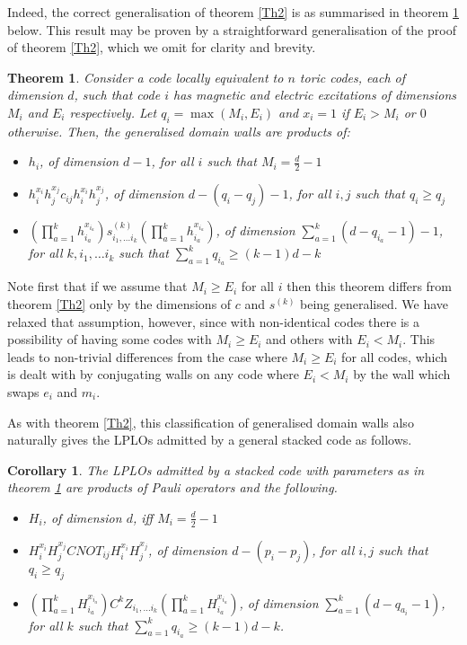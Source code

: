 \documentclass[pra,twocolumn,a4paper,nofootinbib]{revtex4-1}
\newtheorem{theorem}{Theorem}
\newtheorem{cor}{Corollary}
\begin{document}
Indeed, the correct generalisation of theorem \ref{Th2} is as summarised in theorem \ref{Th3} below. This result may be proven by a straightforward generalisation of the proof of theorem \ref{Th2}, which we omit for clarity and brevity.

\begin{theorem}\label{Th3}
Consider a code locally equivalent to $n$ toric codes, each of dimension $d$, such that code $i$ has magnetic and electric excitations of dimensions $M_i$ and $E_i$ respectively. Let $q_i = \max\left(M_i, E_i\right)$ and $x_i=1$ if $E_i > M_i$ or $0$ otherwise. Then, the generalised domain walls are products of:
\begin{itemize}
\item $h_i$, of dimension $d-1$, for all $i$ such that $M_i=\frac{d}{2}-1$
\item $h_i^{x_i}h_j^{x_j} c_{ij}h_i^{x_i}h_j^{x_j}$, of dimension $d-(q_i-q_j)-1$, for all $i,j$ such that $q_i \geq q_j$
\item $\left(\prod_{a=1}^k h_{i_a}^{x_{i_a}}\right) s^{(k)}_{i_1, \ldots i_k} \left(\prod_{a=1}^k h_{i_a}^{x_{i_a}}\right)$, of dimension $\sum_{a=1}^k \left(d-q_{i_a}-1\right)-1$, for all $k, i_1, \ldots i_k$ such that $\sum_{a=1}^k q_{i_a} \geq (k-1)d-k$
\end{itemize}
\end{theorem}
Note first that if we assume that $M_i \geq E_i$ for all $i$ then this theorem differs from theorem \ref{Th2} only by the dimensions of $c$ and $s^{(k)}$ being generalised. We have relaxed that assumption, however, since with non-identical codes there is a possibility of having some codes with $M_i\geq E_i$ and others with $E_i < M_i$. This leads to non-trivial differences from the case where $M_i \geq E_i$ for all codes, which is dealt with by conjugating walls on any code where $E_i < M_i$ by the wall which swaps $e_i$ and $m_i$.

As with theorem \ref{Th2}, this classification of generalised domain walls also naturally gives the LPLOs admitted by a general stacked code as follows.
\begin{cor}\label{cor3}
The LPLOs admitted by a stacked code with parameters as in theorem \ref{Th3} are products of Pauli operators and the following.
\begin{itemize}
\item $H_i$, of dimension $d$, iff $M_i=\frac{d}{2}-1$
\item $H_i^{x_i}H_j^{x_j}CNOT_{ij}H_i^{x_i}H_j^{x_j}$, of dimension $d-(p_i-p_j)$, for all $i,j$ such that $q_i \geq q_j$
\item $\left(\prod_{a=1}^k H_{i_a}^{x_{i_a}}\right)C^kZ_{i_1, \ldots i_k}\left(\prod_{a=1}^k H_{i_a}^{x_{i_a}}\right)$, of dimension $\sum_{a=1}^k(d-q_{a_i}-1)$, for all $k$ such that $\sum_{a=1}^k q_{i_a} \geq (k-1)d-k$.
\end{itemize}
\end{cor}
\end{document}
